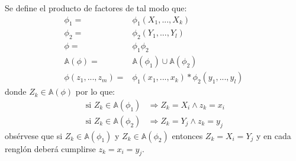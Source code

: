 \begin{definition}[Multiplicación]
Se define el producto de factores de tal modo que:
\begin{align}
 \phi_1 =& \phi_1(X_1,...,X_k) \\
 \phi_2 =& \phi_2(Y_1,...,Y_l) \\
 \phi =& \phi_1 \phi_2 \\
 \mathbb{A}(\phi) =& \mathbb{A}(\phi_1) \cup \mathbb{A}(\phi_2) \\
 \phi(z_1,...,z_m) =& \phi_1(x_1,...,x_k) * \phi_2(y_1,...,y_l)
\end{align}
donde $Z_k \in \mathbb{A}(\phi)$ por lo que:
\begin{align}
 \text{ si } Z_k \in \mathbb{A}(\phi_1) & \Rightarrow Z_k = X_i \land z_k = x_i \\
 \text{ si } Z_k \in \mathbb{A}(\phi_2) & \Rightarrow Z_k = Y_j \land z_k = y_j
\end{align}
obsérvese que si $Z_k \in \mathbb{A}(\phi_1)$ y $Z_k \in \mathbb{A}(\phi_2)$ entonces $Z_k = X_i = Y_j$ y en cada renglón deberá cumplirse $z_k = x_i = y_j$.
\end{definition}


